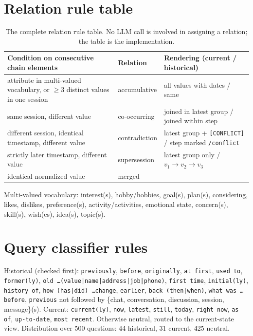 \documentclass[11pt]{article}
\begin{document}
\section{Relation rule table}

\begin{table}[ht]
\centering
\small
\begin{tabular}{@{}p{6.2cm}lp{5.2cm}@{}}
\toprule
\textbf{Condition on consecutive chain elements} & \textbf{Relation} & \textbf{Rendering (current / historical)} \\
\midrule
attribute in multi-valued vocabulary, or $\geq 3$ distinct values in one session & accumulative & all values with dates / same \\
same session, different value & co-occurring & joined in latest group / joined within step \\
different session, identical timestamp, different value & contradiction & latest group + \texttt{[CONFLICT]} / step marked \texttt{/conflict} \\
strictly later timestamp, different value & supersession & latest group only / $v_1 \rightarrow v_2 \rightarrow v_3$ \\
identical normalized value & merged & --- \\
\bottomrule
\end{tabular}
\caption{The complete relation rule table. No LLM call is involved in assigning a relation; the table is the implementation.}
\label{tab:rules}
\end{table}

Multi-valued vocabulary: interest(s), hobby/hobbies, goal(s), plan(s), considering, likes, dislikes, preference(s), activity/activities, emotional state, concern(s), skill(s), wish(es), idea(s), topic(s).

\section{Query classifier rules}

Historical (checked first): \texttt{previously}, \texttt{before}, \texttt{originally}, \texttt{at first}, \texttt{used to}, \texttt{former(ly)}, \texttt{old \ldots(value|name|address|job|phone)}, \texttt{first time}, \texttt{initial(ly)}, \texttt{history of}, \texttt{how (has|did) \ldots change}, \texttt{earlier}, \texttt{back (then|when)}, \texttt{what was \ldots before}, \texttt{previous} not followed by \{chat, conversation, discussion, session, message\}(s). Current: \texttt{current(ly)}, \texttt{now}, \texttt{latest}, \texttt{still}, \texttt{today}, \texttt{right now}, \texttt{as of}, \texttt{up-to-date}, \texttt{most recent}. Otherwise neutral, routed to the current-state view. Distribution over 500 questions: 44 historical, 31 current, 425 neutral.
\end{document}
